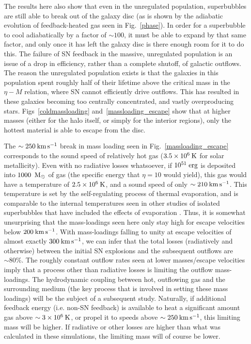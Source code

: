 The results here also show that even in the unregulated population, superbubbles
are still able to break out of the galaxy disc (as is shown by the adiabatic
evolution of feedback-heated gas seen in Fig.~\ref{phase}).  In order for a
superbubble to cool adiabatically by a factor of $\sim100$, it must be able to
expand by that same factor, and only once it has left the galaxy disc is there
enough room for it to do this.  The failure of SN feedback in the massive,
unregulated population is an issue of a drop in efficiency, rather than a
complete shutoff, of galactic outflows.  The reason the unregulated population
exists is that the galaxies in this population spent roughly half of their
lifetime above the critical mass in the $\eta-M$ relation, where SN cannot
efficiently drive outflows.  This has resulted in these galaxies becoming too
centrally concentrated, and vastly overproducing stars.
Figs~\ref{coldmassloading} and~\ref{massloading_escape} show that at higher
masses (either for the halo itself, or simply for the interior regions), only
the hottest material is able to escape from the disc.  

The $\sim250\>{\rm km}\,{\rm s}^{-1}$ break in mass loading seen in
Fig.~\ref{massloading_escape} corresponds to the sound speed of relatively hot
gas ($3.5\times10^6\>{\rm K}$ for solar metallicity).  Even with no radiative losses
whatsoever, if $10^{51}\;\rm{erg}$ is deposited into $1000\;\>{\rm M_{\odot}}$ of gas (the
specific energy that $\eta=10$ would  yield), this gas would have a temperature
of $2.5\times10^6\>{\rm K}$, and a sound speed of only $\sim210\>{\rm km}\,{\rm s}^{-1}$.  This
temperature is set by the self-regulating process of thermal evaporation, and is
comparable to the internal temperatures seen in other studies of isolated
superbubbles that have included the effects of evaporation
\citep{MacLow1988,Silich1996,Keller2014}.  Thus, it is somewhat unsurprising
that the mass-loadings seen here only stay high for escape velocities below
$200\>{\rm km}\,{\rm s}^{-1}$.  With mass-loadings falling to unity at escape velocities of almost
exactly $300\>{\rm km}\,{\rm s}^{-1}$, we can infer that the total losses (radiatively and
otherwise) between the initial SN explosions and the subsequent outflows are
$\sim80\%$.  The roughly constant outflow rates seen at lower masses/escape
velocities imply that a process other than radiative losses is limiting the
outflow mass-loadings.  The hydrodynamic coupling between hot, outflowing gas
and the surrounding medium (the key process that is involved in setting these
mass loadings) will be the subject of a subsequent study.  Naturally, if
additional feedback energy (i.e. non-SN feedback) is available to heat a
significant amount gas above $\sim3\times10^6\>{\rm K}$, or propel it to speeds
above $\sim250\>{\rm km}\,{\rm s}^{-1}$, this limiting mass will be higher. If radiative or other
losses are higher than what was calculated in these simulations, the limiting
mass will of course be lower.

